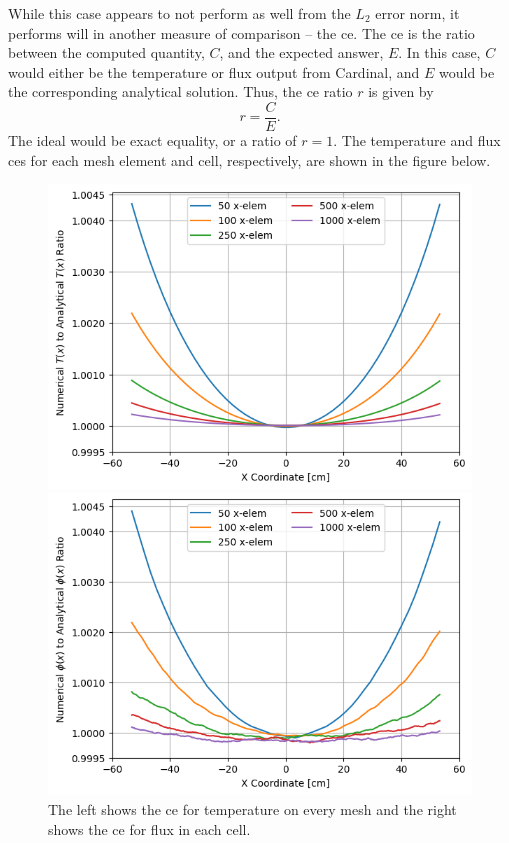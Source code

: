 \documentclass[letterpaper]{mc2023}
\begin{document}
While this case appears to not perform as well from the $L_{2}$ error norm, it performs will in another measure of comparison -- the \gls{ce}. The
\gls{ce} is the ratio between the computed quantity, $C$, and the expected answer, $E$. In this case, $C$ would either be the temperature or flux
output from Cardinal, and $E$ would be the corresponding analytical solution. Thus, the \gls{ce} ratio $r$ is given by
\begin{equation} \label{eq:ce}
   r  = \frac{C}{E}.
\end{equation}
The ideal would be exact equality, or a ratio of $r=1$. The temperature and flux \glspl{ce} for each mesh element and cell, respectively, are shown in the
figure below.
\begin{figure}[H]
    \centering
    \begin{minipage}[b]{0.495\linewidth}
        \includegraphics[width=\linewidth]{figures/temp_num_to_analy_ratios.png}
    \end{minipage}
    \begin{minipage}[b]{0.495\linewidth}
        \includegraphics[width=\linewidth]{figures/flux_num_to_analy_ratios.png}
    \end{minipage}
    \caption{The left shows the \gls{ce} for temperature on every mesh and the right shows the \gls{ce} for flux in each cell.}
\end{figure}
\end{document}
